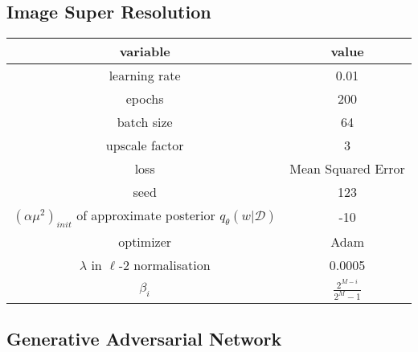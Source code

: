 \subsection{Image Super Resolution}

\begin{table}[h!]
    \centering
    \renewcommand{\arraystretch}{2}
    \begin{tabular}[c]{c | c} 
     \hline
     variable & value \\ [0.5ex] 
     \hline
     learning rate &  0.01\\ 
     
     epochs & 200 \\
     
     batch size & 64 \\
     
     upscale factor & 3 \\
     
     loss & Mean Squared Error \\
     
     seed & 123 \\
     
     $(\alpha \mu^2)_{init}$ of approximate posterior $q_{\theta}(w|\mathcal{D})$ & -10 \\
     
     optimizer & Adam \cite{kingma2014adam} \\
     
     $\lambda$ in $\ell$-2 normalisation & 0.0005 \\
    
     $\beta_i$ & $\frac{2^{M-i}}{2^M-1}$ \cite{blundell2015weight} \\ [1ex] 
     \hline
    \end{tabular} 
    \renewcommand{\arraystretch}{2}
\end{table}


\subsection{Generative Adversarial Network}

